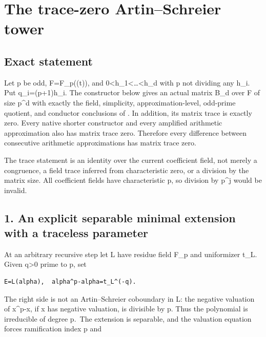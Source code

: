 \clearpage
\section{The trace-zero Artin--Schreier tower}\label{app:odd_tower}


\hypertarget{odd_tower-exact-statement}{%
\subsection{Exact statement}\label{odd_tower-exact-statement}}

Let p be odd, F=F\_p((t)), and
0\textless h\_1\textless\ldots\textless h\_d with p not dividing any
h\_i. Put q\_i=(p+1)h\_i. The constructor below gives an actual matrix
B\_d over F of size p\^{}d with exactly the field, simplicity,
approximation-level, odd-prime quotient, and conductor conclusions of
. In addition, its matrix trace is exactly zero.
Every native shorter constructor and every amplified arithmetic
approximation also has matrix trace zero. Therefore every difference
between consecutive arithmetic approximations has matrix trace zero.

The trace statement is an identity over the current coefficient field,
not merely a congruence, a field trace inferred from characteristic
zero, or a division by the matrix size. All coefficient fields have
characteristic p, so division by p\^{}j would be invalid.

\hypertarget{odd_tower-an-explicit-separable-minimal-extension-with-a-traceless-parameter}{%
\subsection{1. An explicit separable minimal extension with a traceless
parameter}\label{odd_tower-an-explicit-separable-minimal-extension-with-a-traceless-parameter}}

At an arbitrary recursive step let L have residue field F\_p and
uniformizer t\_L. Given q\textgreater0 prime to p, set

\begin{Verbatim}[fontsize=\small,breaklines=true,breakanywhere=true]
E=L(alpha),  alpha^p-alpha=t_L^(-q).
\end{Verbatim}

The right side is not an Artin--Schreier coboundary in L: the negative
valuation of x\^{}p-x, if x has negative valuation, is divisible by p.
Thus the polynomial is irreducible of degree p.~The extension is
separable, and the valuation equation forces ramification index p and


